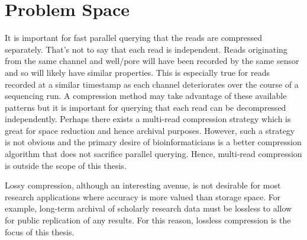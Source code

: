 \chapter{Problem Space} \label{chap:probspace}


It is important for fast parallel querying that the reads are compressed separately. That's not to say that each read is independent. Reads originating from the same channel and well/pore will have been recorded by the same sensor and so will likely have similar properties. This is especially true for reads recorded at a similar timestamp as each channel deteriorates over the course of a sequencing run. A compression method may take advantage of these available patterns but it is important for querying that each read can be decompressed independently. Perhaps there exists a multi-read compression strategy which is great for space reduction and hence archival purposes. However, such a strategy is not obvious and the primary desire of bioinformaticians is a better compression algorithm that does not sacrifice parallel querying. Hence, multi-read compression is outside the scope of this thesis.

Lossy compression, although an interesting avenue, is not desirable for most research applications where accuracy is more valued than storage space. For example, long-term archival of scholarly research data must be lossless to allow for public replication of any results. For this reason, lossless compression is the focus of this thesis.


